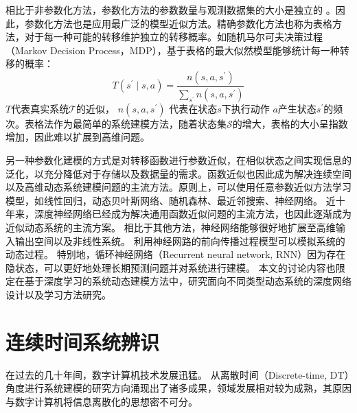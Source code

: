 相比于非参数化方法，参数化方法的参数数量与观测数据集的大小是独立的
。因此，参数化方法也是应用最广泛的模型近似方法。精确参数化方法也称为表格方法，对于每一种可能的转移维护独立的转移概率。如随机马尔可夫决策过程（Markov Decision Process，MDP），基于表格的最大似然模型能够统计每一种转移的概率：
\begin{equation}
    T\left(s^{\prime} \mid s, a\right)=\frac{n\left(s, a, s^{\prime}\right)}{\sum_{s^{\prime}} n\left(s, a, s^{\prime}\right)}
\end{equation}
$T$代表真实系统$\mathcal{\mathcal { T }}$的近似，
$n\left(s, a, s^{\prime}\right)$ 代表在状态$s$下执行动作 $a$产生状态$s^{\prime}$的频次。表格法作为最简单的系统建模方法，随着状态集$\mathcal{S}$的增大，表格的大小呈指数增加，因此难以扩展到高维问题。

另一种参数化建模的方式是对转移函数进行参数近似，在相似状态之间实现信息的泛化，以充分降低对于存储以及数据量的需求。函数近似也因此成为解决连续空间以及高维动态系统建模问题的主流方法。原则上，可以使用任意参数近似方法学习模型，如线性回归\cite{silver2008sample}，动态贝叶斯网络、随机森林、最近邻搜索、神经网络\cite{werbos1989neural}。
近十年来，深度神经网络已经成为解决通用函数近似问题的主流方法，也因此逐渐成为近似动态系统的主流方案。
相比于其他方法，神经网络能够很好地扩展至高维输入输出空间以及非线性系统。
利用神经网路的前向传播过程模型可以模拟系统的动态过程\cite{temeng1995model, tan1996nonlinear}。
特别地，循环神经网络（Recurrent neural network, RNN）因为存在隐状态，可以更好地处理长期预测问题并对系统进行建模\cite{delgado1995dynamic, zamarreno1998state}。
本文的讨论内容也限定在基于深度学习的系统动态建模方法中，研究面向不同类型动态系统的深度网络设计以及学习方法研究。



\section{连续时间系统辨识}

在过去的几十年间，数字计算机技术发展迅猛。
从离散时间（Discrete-time, DT）角度进行系统建模的研究方向涌现出了诸多成果，领域发展相对较为成熟，其原因与数字计算机将信息离散化的思想密不可分。

